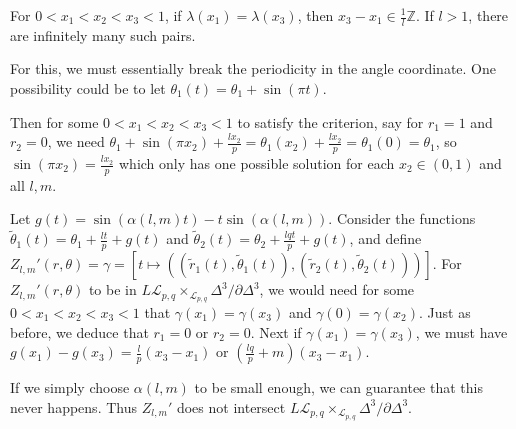 \documentclass[reqno]{amsart}
\theoremstyle{definition}
\theoremstyle{remark}
\begin{document}
    For $0 < x_1 < x_2 < x_3 < 1$, if
    $\lambda(x_1 ) = \lambda(x_3)$, then
    $x_3 - x_1  \in  \frac{1}{l} \mathbb{Z}$.
    If $l>1$, there are infinitely many such pairs.
    
    For this, we must essentially break the periodicity in
    the angle coordinate.
    One possibility could be to
    let $\theta_1 (t) = 
    \theta_1 + \sin(\pi t)$.

    Then for some $0 < x_1 < x_2 < x_3 < 1$ to satisfy the
    criterion, say for $r_1 = 1$ and $r_2 = 0$, we need
    $\theta_1 + \sin(\pi x_2) + \frac{l x_2}{p}
    = \theta_1(x_2) + \frac{l x_2}{p} = 
    \theta_1(0) = \theta_1$, so
    $\sin \left( \pi x_2 \right) = 
    \frac{lx_2}{p}$ which only
    has one possible solution for each $x_2 \in (0,1)$ and
    all $l,m$.

    
    Let $g(t) = \sin\left( \alpha(l,m) t \right) -
    t \sin(\alpha(l,m))$.
    Consider the functions
    $\tilde{\theta}_1(t) =  
    \theta_1 + \frac{lt}{p}  + g(t)$ and
    $\tilde{\theta}_2 (t) = 
    \theta_2 + \frac{lqt}{p} + 
    g(t)$, and
    define $Z_{l,m}'(r, \theta) = 
    \gamma = 
    \left[ t\mapsto \left( \left( \tilde{r}_1(t), \tilde{\theta}_1 (t) \right) , 
    \left( \tilde{r}_2 (t) , \tilde{\theta}_2 (t) \right) \right) \right] $.
    For $Z_{l,m}'(r, \theta)$ to be in
    $L \mathcal{L}_{p,q} \times_{\mathcal{L}_{p,q}}
    \Delta^3 / \partial \Delta^3$, we would need
    for some $0 < x_1 < x_2 < x_3 < 1$ that
    $\gamma(x_1) = \gamma(x_3)$ and
    $\gamma(0) = \gamma(x_2)$. Just as before,
    we deduce that
    $r_1 = 0$ or $r_2 = 0$.
    Next if 
    $\gamma(x_1) = \gamma(x_3)$, we must have
    $g(x_1) - g(x_3) = 
    \frac{l}{p}(x_3- x_1)$ or
    $(\frac{lq}{p} + m)(x_3-x_1)$.

    If we simply choose $\alpha(l,m)$ to be small enough, we
    can guarantee that this never happens.
    Thus $Z_{l,m}'$ does not intersect
    $L \mathcal{L}_{p,q} \times_{\mathcal{L}_{p,q}} \Delta^3 / 
    \partial \Delta^3$.
    




    


















    \newpage
\end{document}
